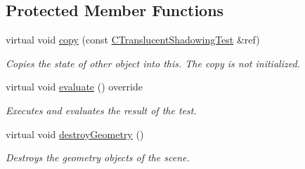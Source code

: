 \subsection*{Protected Member Functions}
\begin{DoxyCompactItemize}
\item 
\mbox{\label{class_unit_test_1_1_c_translucent_shadowing_test_a0fdf0b3cd79482b89c235b7486b770b1}} 
virtual void \mbox{\hyperlink{class_unit_test_1_1_c_translucent_shadowing_test_a0fdf0b3cd79482b89c235b7486b770b1}{copy}} (const \mbox{\hyperlink{class_unit_test_1_1_c_translucent_shadowing_test}{C\+Translucent\+Shadowing\+Test}} \&ref)
\begin{DoxyCompactList}\small\item\em Copies the state of other object into this. The copy is not initialized. \end{DoxyCompactList}\item 
\mbox{\label{class_unit_test_1_1_c_translucent_shadowing_test_a51a8dbb6c85fac8fa1b595cc0d72d8c5}} 
virtual void \mbox{\hyperlink{class_unit_test_1_1_c_translucent_shadowing_test_a51a8dbb6c85fac8fa1b595cc0d72d8c5}{evaluate}} () override
\begin{DoxyCompactList}\small\item\em Executes and evaluates the result of the test. \end{DoxyCompactList}\item 
\mbox{\label{class_unit_test_1_1_c_translucent_shadowing_test_abf0d20902fbb93953634d30ab9947f11}} 
virtual void \mbox{\hyperlink{class_unit_test_1_1_c_translucent_shadowing_test_abf0d20902fbb93953634d30ab9947f11}{destroy\+Geometry}} ()
\begin{DoxyCompactList}\small\item\em Destroys the geometry objects of the scene. \end{DoxyCompactList}\end{DoxyCompactItemize}
